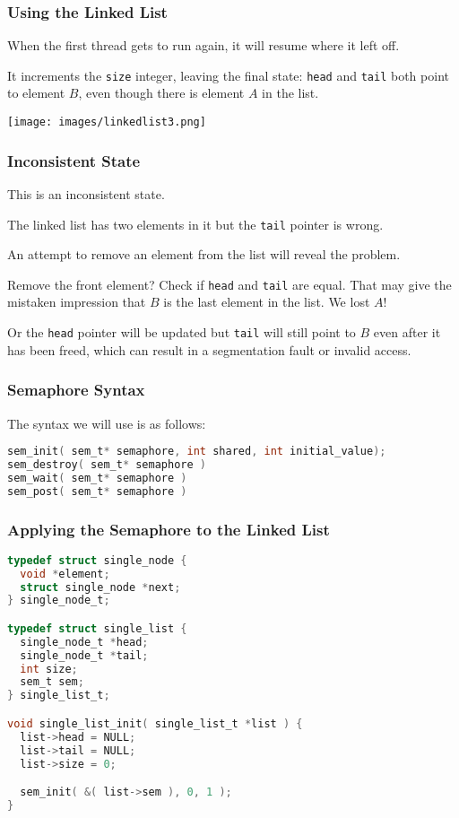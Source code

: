 \begin{frame}
	\frametitle{Using the Linked List}

	When the first thread gets to run again, it will resume where it left off.

	It increments the \texttt{size} integer, leaving the final state: \texttt{head} and \texttt{tail} both point to element $B$, even though there is element $A$ in the list.

	\begin{center}
		\texttt{[image: images/linkedlist3.png]}
	\end{center}


\end{frame}

\begin{frame}
	\frametitle{Inconsistent State}

	This is an \alert{inconsistent state}.

	The linked list has two elements in it but the \texttt{tail} pointer is wrong.

	An attempt to remove an element from the list will reveal the problem.

	Remove the front element?
	Check if \texttt{head} and \texttt{tail} are equal.
	That may give the mistaken impression that $B$ is the last element in the list.
	We lost $A$!

	Or the \texttt{head} pointer will be updated but \texttt{tail} will still point to $B$ even after it has been freed, which can result in a segmentation fault or invalid access.


\end{frame}

\begin{frame}[fragile]
	\frametitle{Semaphore Syntax}

	The syntax we will use is as follows:

	\begin{lstlisting}[language=C]
sem_init( sem_t* semaphore, int shared, int initial_value);
sem_destroy( sem_t* semaphore )
sem_wait( sem_t* semaphore )
sem_post( sem_t* semaphore )
	\end{lstlisting}

\end{frame}

\begin{frame}[fragile]
	\frametitle{Applying the Semaphore to the Linked List}

	\begin{lstlisting}[language=C]
typedef struct single_node {
  void *element;
  struct single_node *next;
} single_node_t;

typedef struct single_list {
  single_node_t *head;
  single_node_t *tail;
  int size;
  sem_t sem;
} single_list_t;

void single_list_init( single_list_t *list ) {
  list->head = NULL;
  list->tail = NULL;
  list->size = 0;

  sem_init( &( list->sem ), 0, 1 );
}
	\end{lstlisting}
\end{frame}

